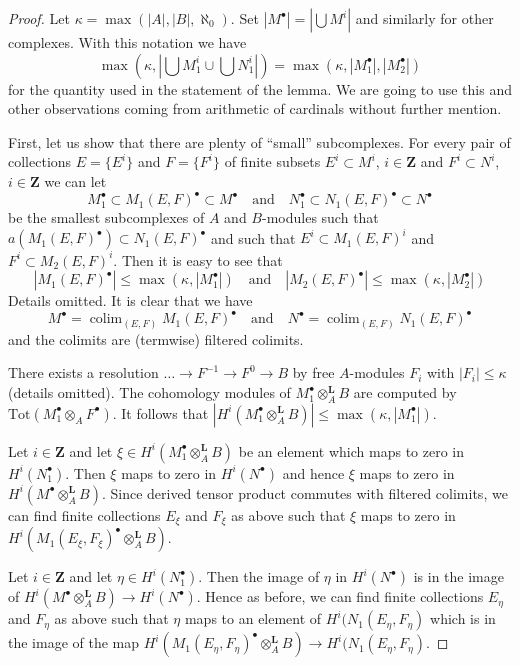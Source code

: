 \documentclass[10pt,a4paper]{amsart}
\theoremstyle{plain}
\theoremstyle{definition}
\theoremstyle{remark}
\numberwithin{equation}{subsection}
\def\colim{\mathop{\mathrm{colim}}\nolimits}
\begin{document}
\begin{proof}
Let $\kappa = \max(|A|, |B|, \aleph_0)$. Set $|M^\bullet| = |\bigcup M^i|$
and similarly for other complexes. With this notation we have
$$
\max(\kappa, |\bigcup M_1^i \cup \bigcup N_1^i|) =
\max(\kappa, |M_1^\bullet|, |M_2^\bullet|)
$$
for the quantity used in the statement of the lemma. We are going to
use this and other observations coming from arithmetic of cardinals
without further mention.

\medskip\noindent
First, let us show that there are plenty of ``small'' subcomplexes.
For every pair of collections $E = \{E^i\}$ and $F = \{F^i\}$
of finite subsets $E^i \subset M^i$, $i \in \mathbf{Z}$
and $F^i \subset N^i$, $i \in \mathbf{Z}$ we can let
$$
M_1^\bullet \subset M_1(E, F)^\bullet \subset M^\bullet
\quad\text{and}\quad
N_1^\bullet \subset N_1(E, F)^\bullet \subset N^\bullet
$$
be the smallest subcomplexes of $A$ and $B$-modules
such that $a(M_1(E, F)^\bullet) \subset N_1(E, F)^\bullet$
and such that $E^i \subset M_1(E, F)^i$ and $F^i \subset M_2(E, F)^i$.
Then it is easy to see that
$$
|M_1(E, F)^\bullet| \leq \max(\kappa, |M_1^\bullet|)
\quad\text{and}\quad
|M_2(E, F)^\bullet| \leq \max(\kappa, |M_2^\bullet|)
$$
Details omitted. It is clear that we have
$$
M^\bullet = \colim_{(E, F)} M_1(E, F)^\bullet
\quad\text{and}\quad
N^\bullet = \colim_{(E, F)} N_1(E, F)^\bullet
$$
and the colimits are (termwise) filtered colimits.

\medskip\noindent
There exists a resolution $\ldots \to F^{-1} \to F^0 \to B$
by free $A$-modules $F_i$ with $|F_i| \leq \kappa$ (details omitted).
The cohomology modules of $M_1^\bullet \otimes_A^\mathbf{L} B$ are
computed by $\text{Tot}(M_1^\bullet \otimes_A F^\bullet)$.
It follows that
$|H^i(M_1^\bullet \otimes_A^\mathbf{L} B)| \leq \max(\kappa, |M_1^\bullet|)$.

\medskip\noindent
Let $i \in \mathbf{Z}$ and let
$\xi \in H^i(M_1^\bullet \otimes_A^\mathbf{L} B)$
be an element which maps to zero in $H^i(N_1^\bullet)$.
Then $\xi$ maps to zero in $H^i(N^\bullet)$ and hence
$\xi$ maps to zero in $H^i(M^\bullet \otimes_A^\mathbf{L} B)$.
Since derived tensor product commutes with filtered colimits,
we can find finite collections $E_\xi$ and $F_\xi$
as above such that $\xi$ maps to zero in
$H^i(M_1(E_\xi, F_\xi)^\bullet \otimes_A^\mathbf{L} B)$.

\medskip\noindent
Let $i \in \mathbf{Z}$ and let $\eta \in H^i(N_1^\bullet)$.
Then the image of $\eta$ in $H^i(N^\bullet)$ is in the image
of $H^i(M^\bullet \otimes_A^\mathbf{L} B) \to H^i(N^\bullet)$.
Hence as before, we can find finite collections $E_\eta$ and $F_\eta$
as above such that $\eta$ maps to an element of
$H^i(N_1(E_\eta, F_\eta)$ which is in the image of the map
$H^i(M_1(E_\eta, F_\eta)^\bullet \otimes_A^\mathbf{L} B) \to
H^i(N_1(E_\eta, F_\eta)$.


\end{proof}
\end{document}
